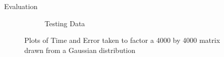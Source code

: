 \documentclass[final]{beamer}
\begin{document}
{\begin{frame}{}
\begin{center}
\begin{columns}[t]
\begin{column}{0.32\textwidth}
\begin{block}{\huge Evaluation}
\begin{itemize}
{\begin{figure}
\begin{subfigure}[b]{.45\textwidth}
\begin{center}
		\caption{Testing Data}
\end{center}
	\end{subfigure}
\hfill
	\caption{Plots of Time and Error taken to factor a 4000 by 4000 matrix drawn from a Gaussian distribution}	
\end{figure}

}
\end{itemize}
\end{block}
\end{column}
\end{columns}
\end{center}
\end{frame}}
\end{document}
